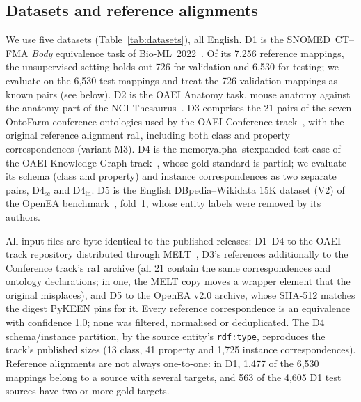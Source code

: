 
\subsection{Datasets and reference alignments}
\label{sec:datasets}

We use five datasets (Table~\ref{tab:datasets}), all English. D1 is the
SNOMED~CT--FMA \emph{Body} equivalence task of Bio-ML~2022~\cite{he2022bioml}.
Of its 7,256 reference mappings, the unsupervised setting holds out 726 for
validation and 6,530 for testing; we evaluate on the 6,530 test mappings and
treat the 726 validation mappings as known pairs (see below). D2 is the OAEI
Anatomy task, mouse anatomy against the anatomy part of the NCI
Thesaurus~\cite{bodenreider2005mice,oaei2024anatomy}. D3 comprises the 21
pairs of the seven OntoFarm conference ontologies used by the OAEI Conference
track~\cite{zamazal2017ontofarm,oaei2024conference}, with the original
reference alignment ra1, including both class and property correspondences
(variant M3). D4 is the memoryalpha--stexpanded test case of the OAEI
Knowledge Graph track~\cite{hertling2020kgtrack}, whose gold standard is
partial; we evaluate its schema (class and property) and instance
correspondences as two separate pairs, D4$_{\mathrm{sc}}$ and
D4$_{\mathrm{in}}$. D5 is the English DBpedia--Wikidata 15K dataset (V2) of
the OpenEA benchmark~\cite{sun2020openea}, fold~1, whose entity labels were
removed by its authors.

All input files are byte-identical to the published releases: D1--D4 to the
OAEI track repository distributed through MELT~\cite{hertling2019melt}, D3's
references additionally to the Conference track's ra1 archive (all 21 contain
the same correspondences and ontology declarations; in one, the MELT copy
moves a wrapper element that the original misplaces), and D5 to the
OpenEA v2.0 archive, whose SHA-512 matches the digest PyKEEN pins for it. Every
reference correspondence is an equivalence with confidence 1.0; none was
filtered, normalised or deduplicated. The D4 schema/instance partition, by the
source entity's \texttt{rdf:type}, reproduces the track's published sizes
(13 class, 41 property and 1,725 instance correspondences). Reference
alignments are not always one-to-one: in D1, 1,477 of the 6,530 mappings
belong to a source with several targets, and 563 of the 4,605 D1 test
sources have two or more gold targets.

